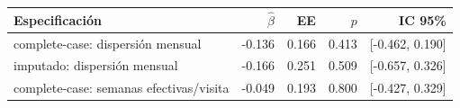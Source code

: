 \begin{tabular}{p{7cm}rrrr}
\toprule
Especificación & $\hat\beta$ & EE & $p$ & IC 95\% \\
\midrule
complete-case: dispersión mensual & -0.136 & 0.166 & 0.413 & [-0.462, 0.190] \\
imputado: dispersión mensual & -0.166 & 0.251 & 0.509 & [-0.657, 0.326] \\
complete-case: semanas efectivas/visita & -0.049 & 0.193 & 0.800 & [-0.427, 0.329] \\
\bottomrule
\end{tabular}
